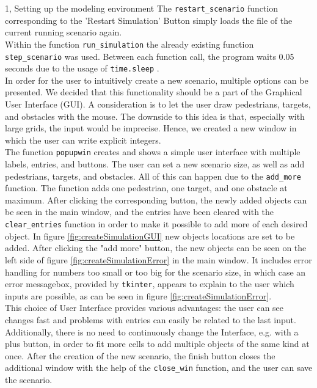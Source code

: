 \documentclass[10pt,a4paper]{article}
\begin{document}
\begin{task}{1, Setting up the modeling environment}
The \verb|restart_scenario| function corresponding to the 'Restart Simulation' Button simply loads the file of the current running scenario again. \\ 
Within the function \verb|run_simulation| the already existing function \verb|step_scenario| was used. Between each function call, the program waits 0.05 seconds due to the usage of \verb|time.sleep| \cite{time}. \\

In order for the user to intuitively create a new scenario, multiple options can be presented. We decided that this functionality should be a part of the Graphical User Interface (GUI). A consideration is to let the user draw pedestrians, targets, and obstacles with the mouse. The downside to this idea is that, especially with large grids, the input would be imprecise. Hence, we created a new window in which the user can write explicit integers. \\
The function \verb|popupwin| creates and shows a simple user interface with multiple labels, entries, and buttons. The user can set a new scenario size, as well as add pedestrians, targets, and obstacles. All of this can happen due to the \verb|add_more| function. The function adds one pedestrian, one target, and one obstacle at maximum. After clicking the corresponding button, the newly added objects can be seen in the main window, and the entries have been cleared with the \verb|clear_entries| function in order to make it possible to add more of each desired object. In figure \ref{fig:createSimulationGUI} new objects locations are set to be added. After clicking the "add more" button, the new objects can be seen on the left side of figure \ref{fig:createSimulationError} in the main window. It includes error handling for numbers too small or too big for the scenario size, in which case an error messagebox, provided by \verb|tkinter|, appears to explain to the user which inputs are possible, as can be seen in figure \ref{fig:createSimulationError}. \\ 

This choice of User Interface provides various advantages: the user can see changes fast and problems with entries can easily be related to the last input. Additionally, there is no need to continuously change the Interface, e.g. with a plus button, in order to fit more cells to add multiple objects of the same kind at once. After the creation of the new scenario, the finish button closes the additional window with the help of the \verb|close_win| function, and the user can save the scenario. \\


\end{task}
\end{document}
